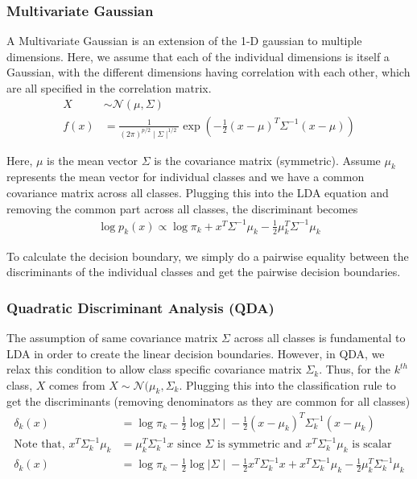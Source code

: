 \documentclass[11pt, a4paper]{article}
\begin{document}
    \subsubsection{Multivariate Gaussian}
    A Multivariate Gaussian is an extension of the 1-D gaussian to multiple dimensions. Here, we assume that each of the individual dimensions is itself a Gaussian, with the different dimensions having correlation with each other, which are all specified in the correlation matrix.
    \begin{align*}
        X &\sim \mathcal{N}(\mu, \Sigma) \\
        f(x) &= \frac{1}{(2\pi)^{p/2}\mid \Sigma \mid^{1/2}} \exp(-\frac{1}{2}(x-\mu)^{T}\Sigma^{-1}(x-\mu))
    \end{align*}

    Here, $\mu$ is the mean vector $\Sigma$ is the covariance matrix (symmetric). \newline 
    Assume $\mu_{k}$ represents the mean vector for individual classes and we have a common covariance matrix across all classes. Plugging this into the LDA equation and removing the common part across all classes, the discriminant becomes
    \begin{align*}
        \log{p_{k}(x)} \propto \log{\pi_{k}} + x^{T}\Sigma^{-1}\mu_{k} - \frac{1}{2}\mu_{k}^{T}\Sigma^{-1}\mu_{k}    
    \end{align*}

    To calculate the decision boundary, we simply do a pairwise equality between the discriminants of the individual classes and get the pairwise decision boundaries.

    
    \subsubsection{Quadratic Discriminant Analysis (QDA)}
    The assumption of same covariance matrix $\Sigma$ across all classes is fundamental to LDA in order to create the linear decision boundaries. \newline
    However, in QDA, we relax this condition to allow class specific covariance matrix $\Sigma_{k}$. Thus, for the $k^{th}$ class, $X$ comes from $X \sim \mathcal{N}(\mu_{k}, \Sigma_{k}$. \newline
    Plugging this into the classification rule to get the discriminants (removing denominators as they are common for all classes)
    \begin{align*}
        \delta_{k}(x) &= \log{\pi_{k}} -\frac{1}{2}\log{\mid\Sigma \mid} - \frac{1}{2}(x-\mu_{k})^{T}\Sigma_{k}^{-1}(x-\mu_{k}) \\
        \text{Note that, } x^{T}\Sigma_{k}^{-1}\mu_{k} &= \mu_{k}^{T}\Sigma_{k}^{-1}x \text{  since $\Sigma$ is symmetric and $x^{T}\Sigma_{k}^{-1}\mu_{k}$ is scalar} \\
        \delta_{k}(x) &= \log{\pi_{k}} -\frac{1}{2}\log{\mid\Sigma \mid} - \frac{1}{2}x^{T}\Sigma_{k}^{-1}x + x^{T}\Sigma_{k}^{-1}\mu_{k} -\frac{1}{2}\mu_{k}^{T}\Sigma_{k}^{-1}\mu_{k}
    \end{align*}
\end{document}

